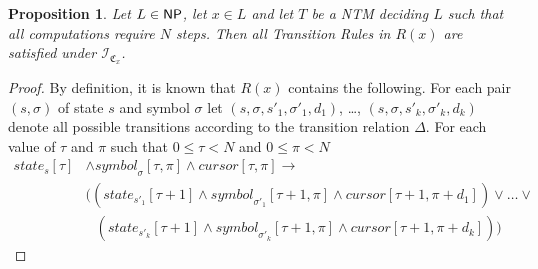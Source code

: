 \documentclass [11pt]{article}
\newtheorem{proposition}[theorem]{Proposition}
\newcommand{\ccfont}[1]{\protect\mathsf{#1}}
\newcommand{\NP}{\ccfont{NP}}
\newcommand{\sym}[3]{\textit{symbol}_{#1}[#2,#3]}
\newcommand{\cursor}[2]{\textit{cursor}[#1,#2]}
\newcommand{\state}[2]{\textit{state}_{#1}[#2]}
\newcommand{\sequint}[2]{ \mathcal{#1}_{\mathfrak{C}_{#2}}}
\begin{document}
\begin{proposition}
\label{prop:r-trans}
Let $L \in \NP$, let $x \in L$ and let $T$ be a NTM deciding $L$ such that all computations require $N$ steps. Then all \emph{Transition Rules} in $R(x)$ are satisfied under $\sequint{I}{x}$.
\end{proposition}
\begin{proof}
By definition, it is known that $R(x)$ contains the following.   For each pair $(s,\sigma)$ of state $s$ and symbol $\sigma$ let 
$(s,\sigma,s'_1,\sigma'_1,d_1)$, \dots, $(s,\sigma,s'_k,\sigma'_k,d_k)$ denote all possible transitions according to the  transition relation $\Delta$.
For each value of $\tau$ and $\pi$ such that $0\leq \tau<N$ and $0\leq \pi < N$
\begin{equation*}
\begin{split}
\state{s}{\tau}& \wedge \sym{\sigma}{\tau}{\pi} \wedge \cursor{\tau}{\pi} \to \\
& \Big(({\state{s'_1}{\tau+1}}\wedge \sym{\sigma'_1}{\tau+1}{\pi} \wedge {\cursor{\tau+1}{\pi+d_1}} ) \vee \dots \vee \\
& \; \; \,  ({\state{s'_k}{\tau+1}} \wedge \sym{\sigma'_k}{\tau+1}{\pi} \wedge {\cursor{\tau+1}{\pi+d_k}} ) \Big)
\end{split}
\end{equation*}


\end{proof}
\end{document}
